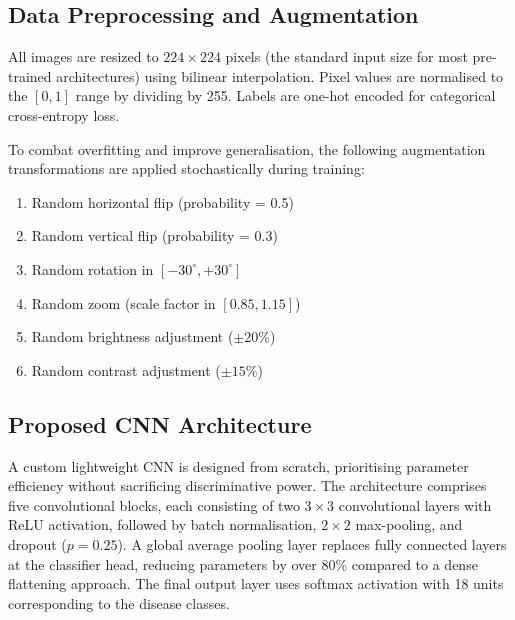 \subsection{Data Preprocessing and Augmentation}

All images are resized to $224 \times 224$ pixels (the standard input size
for most pre-trained architectures) using bilinear interpolation. Pixel
values are normalised to the $[0, 1]$ range by dividing by 255. Labels are
one-hot encoded for categorical cross-entropy loss.

\parsp
To combat overfitting and improve generalisation, the following augmentation
transformations are applied stochastically during training:

\begin{enumerate}[label=\textcolor{accent}{\textbullet}, leftmargin=2em, itemsep=3pt]
  \item Random horizontal flip (probability = 0.5)
  \item Random vertical flip (probability = 0.3)
  \item Random rotation in $[-30^\circ, +30^\circ]$
  \item Random zoom (scale factor in $[0.85, 1.15]$)
  \item Random brightness adjustment ($\pm 20\%$)
  \item Random contrast adjustment ($\pm 15\%$)
\end{enumerate}

\subsection{Proposed CNN Architecture}

A custom lightweight CNN is designed from scratch, prioritising parameter
efficiency without sacrificing discriminative power. The architecture
comprises five convolutional blocks, each consisting of two $3 \times 3$
convolutional layers with ReLU activation, followed by batch normalisation,
$2 \times 2$ max-pooling, and dropout ($p = 0.25$). A global average pooling
layer replaces fully connected layers at the classifier head, reducing
parameters by over 80\% compared to a dense flattening approach. The final
output layer uses softmax activation with 18 units corresponding to the
disease classes.

